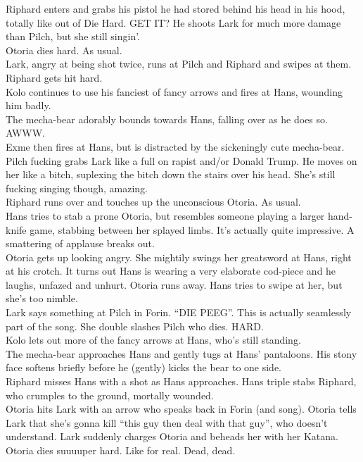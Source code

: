 Riphard enters and grabs his pistol he had stored behind his head in his hood, totally like out of Die Hard. GET IT? He shoots Lark for much more damage than Pilch, but she still singin’.\\
Otoria dies hard. As usual.\\
Lark, angry at being shot twice, runs at Pilch and Riphard and swipes at them. Riphard gets hit hard.\\
Kolo continues to use his fanciest of fancy arrows and fires at Hans, wounding him badly.\\
The mecha-bear adorably bounds towards Hans, falling over as he does so. AWWW.\\
Exme then fires at Hans, but is distracted by the sickeningly cute mecha-bear.\\
Pilch fucking grabs Lark like a full on rapist and/or Donald Trump. He moves on her like a bitch, suplexing the bitch down the stairs over his head. She’s still fucking singing though, amazing.\\
Riphard runs over and touches up the unconscious Otoria. As usual.\\
Hans tries to stab a prone Otoria, but resembles someone playing a larger hand-knife game, stabbing between her splayed limbs. It’s actually quite impressive. A smattering of applause breaks out.\\
Otoria gets up looking angry. She mightily swings her greatsword at Hans, right at his crotch. It turns out Hans is wearing a very elaborate cod-piece and he laughs, unfazed and unhurt. Otoria runs away. Hans tries to swipe at her, but she’s too nimble.\\
Lark says something at Pilch in Forin. “DIE PEEG”. This is actually seamlessly part of the song. She double slashes Pilch who dies. HARD.\\
Kolo lets out more of the fancy arrows at Hans, who’s still standing.\\
The mecha-bear approaches Hans and gently tugs at Hans’ pantaloons. His stony face softens briefly before he (gently) kicks the bear to one side.\\
Riphard misses Hans with a shot as Hans approaches. Hans triple stabs Riphard, who crumples to the ground, mortally wounded.\\
Otoria hits Lark with an arrow who speaks back in Forin (and song). Otoria tells Lark that she’s gonna kill “this guy then deal with that guy”, who doesn’t understand. Lark suddenly charges Otoria and beheads her with her Katana. Otoria dies suuuuper hard. Like for real. Dead, dead.\\
